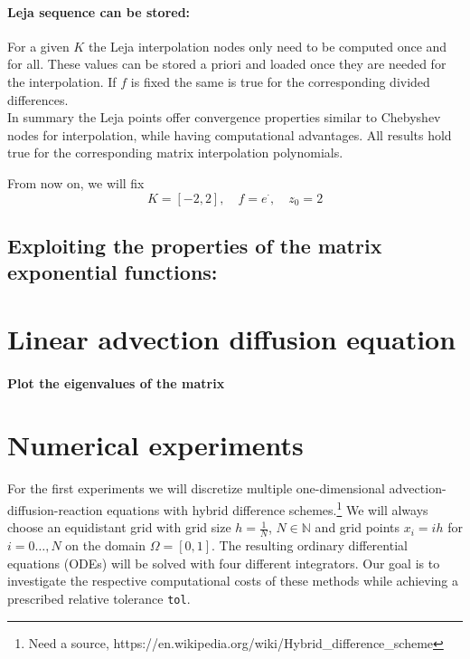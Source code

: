 \documentclass{scrartcl}
\begin{document}
\paragraph{Leja sequence can be stored:}
For a given $K$ the Leja interpolation nodes only need to be computed once and for all. These values can be stored a priori and loaded once they are needed for the interpolation. If $f$ is fixed the same is true for the corresponding divided differences. \\

In summary the Leja points offer convergence properties similar to Chebyshev nodes for interpolation, while having computational advantages. All results hold true for the corresponding matrix interpolation polynomials.

From now on, we will fix 
\[K=[-2,2], \quad f = e^\cdot, \quad z_0 = 2 \]

\subsection{Exploiting the properties of the matrix exponential functions:}


\section{Linear advection diffusion equation}

\paragraph{Plot the eigenvalues of the matrix}


\section{Numerical experiments}
For the first experiments we will discretize multiple one-dimensional advection-diffusion-reaction equations with hybrid difference schemes.\footnote{Need a source, https://en.wikipedia.org/wiki/Hybrid\_difference\_scheme} We will always choose an equidistant grid with grid size $h = \frac{1}{N}$, $N\in\mathbb{N}$ and grid points $x_i = ih$ for $i=0\dots,N$ on the domain $\Omega = [0,1]$. The resulting ordinary differential equations (ODEs) will be solved with four different integrators. Our goal is to investigate the respective computational costs of these methods while achieving a prescribed relative tolerance \texttt{tol}.
\end{document}

